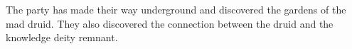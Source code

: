 The party has made their way underground and discovered the gardens of the mad druid.
They also discovered the connection between the druid and the knowledge deity remnant.
